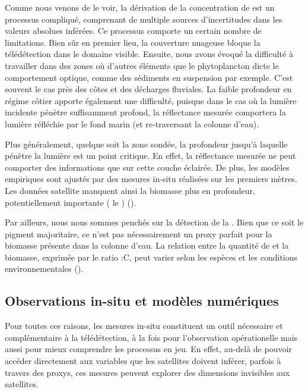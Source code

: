 Comme nous venons de le voir, la dérivation de la concentration de  est un processus compliqué, comprenant de multiple sources d'incertitudes dans les valeurs absolues inférées.
Ce processus comporte un certain nombre de limitations.
Bien sûr en premier lieu, la couverture nuageuse bloque la télédétection dans le domaine visible.
Ensuite, nous avons évoqué la difficulté à travailler dans des zones où d'autres éléments que le phytoplancton dicte le comportement optique, comme des sédiments en suspension par exemple.
C'est souvent le cas près des côtes et des décharges fluviales.
La faible profondeur en régime côtier apporte également une difficulté, puisque dans le cas où la lumière incidente pénètre suffisamment profond, la réflectance mesurée comportera la lumière réfléchie par le fond marin (et re-traversant la colonne d'eau).

Plus généralement, quelque soit la zone sondée, la profondeur jusqu'à laquelle pénètre la lumière est un point critique.
En effet, la réflectance mesurée ne peut comporter des informations que sur cette couche éclairée.
De plus, les modèles empiriques sont ajustés par des mesures in-situ réalisées sur les premiers mètres.
Les données satellite manquent ainsi la biomasse plus en profondeur, potentiellement importante ( le ) (\cite{morel_1989,uitz_2006}).

Par ailleurs, nous nous sommes penchés sur la détection de la . Bien que ce soit le pigment majoritaire, ce n'est pas nécessairement un proxy parfait pour la biomasse présente dans la colonne d'eau.
La relation entre la quantité de  et la biomasse, exprimée par le ratio \hbox{:C}, peut varier selon les espèces et les conditions environnementales (\cite{behrenfeld_2015,halsey_2015,inomura_2022}).


\subsection{Observations in-situ et modèles numériques}

Pour toutes ces raisons, les mesures in-situ constituent un outil nécessaire et complémentaire à la télédétection, à la fois pour l'observation opérationelle mais aussi pour mieux comprendre les processus en jeu.
En effet, au-delà de pouvoir accéder directement aux variables que les satellites doivent inférer, parfois à travers des proxys, ces mesures peuvent explorer des dimensions invisibles aux satellites.

